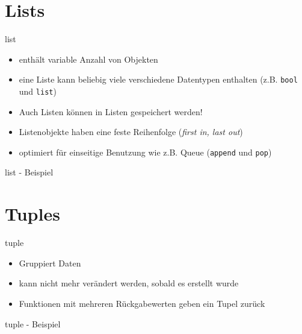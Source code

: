 \section{Lists}

\begin{frame}{list}
	\begin{itemize}
		\item enthält variable Anzahl von Objekten
		\item eine Liste kann beliebig viele verschiedene Datentypen enthalten (z.B. \texttt{bool} und \texttt{list})
		\item Auch Listen können in Listen gespeichert werden!
		\item Listenobjekte haben eine feste Reihenfolge (\textit{first in, last out})
		\item optimiert für einseitige Benutzung wie z.B. Queue (\alert{\texttt{append}} und \alert{\texttt{pop}})
	\end{itemize}
\end{frame}

\begin{frame}{list - Beispiel}
	
\end{frame}


\section{Tuples}

\begin{frame}{tuple}
	\begin{itemize}
		\item Gruppiert Daten
		\item kann nicht mehr verändert werden, sobald es erstellt wurde
		\item Funktionen mit mehreren Rückgabewerten geben ein Tupel zurück
	\end{itemize}
\end{frame}

\begin{frame}{tuple - Beispiel}
	
\end{frame}


